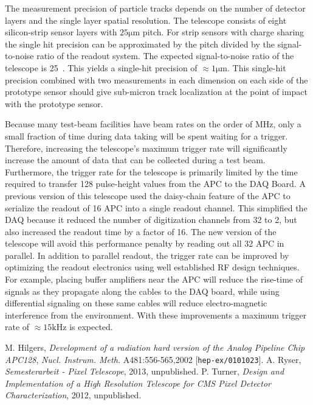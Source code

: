 \documentclass{PoS}
\newcommand{\micron}{\si{\micro\meter}}
\begin{document}
The measurement precision of particle tracks depends on the number of detector
layers and the single layer spatial resolution. The telescope consists of eight
silicon-strip sensor layers with $25\micron$ pitch. For strip sensors
with charge sharing the single hit precision can be approximated by the
pitch divided by the signal-to-noise ratio of the readout system.
The expected signal-to-noise ratio of the telescope is 25~\cite{Ryser2013}. This yields a single-hit precision of
$\approx1\micron$. This single-hit precision combined with two measurements in
each dimension on each side of the prototype sensor should give sub-micron
track localization at the point of impact with the prototype sensor.

Because many test-beam facilities have beam rates on the order of
\si{\mega\hertz}, only a small fraction of time during data taking will be
spent waiting for a trigger. Therefore, increasing the telescope's maximum
trigger rate will significantly increase the amount of data that can be
collected during a test beam.  Furthermore, the trigger rate for the telescope
is primarily limited by the time required to transfer 128 pulse-height values
from the APC to the DAQ Board.  A previous version of this telescope used the
daisy-chain feature of the APC to serialize the readout of 16 APC into a single
readout channel\cite{Turner2012}. This simplified the DAQ because it reduced the number of
digitization channels from 32 to 2, but also increased the readout time by a
factor of 16. The new version of the telescope will avoid this performance
penalty by reading out all 32 APC in parallel. In addition to parallel readout, the
trigger rate can be improved by optimizing the readout electronics using well
established RF design techniques. For example, placing buffer amplifiers near
the APC will reduce the rise-time of signals as they propagate along the cables
to the DAQ board, while using differential signaling on these same cables will
reduce electro-magnetic interference from the environment. With these
improvements a maximum trigger rate of $\approx15\si{\kilo\hertz}$ is expected.


\begin{thebibliography}{99}
M. Hilgers,
\emph{Development of a radiation hard version of the Analog Pipeline Chip APC128},
\emph{Nucl. Instrum. Meth.} A481:556-565,2002
[{\tt hep-ex/0101023}].
A. Ryser,
\emph{Semesterarbeit \-- Pixel Telescope},
2013, unpublished.
P. Turner,
\emph{Design and Implementation of a High Resolution Telescope for CMS Pixel Detector Characterization},
2012, unpublished.
\end{thebibliography}
\end{document}

